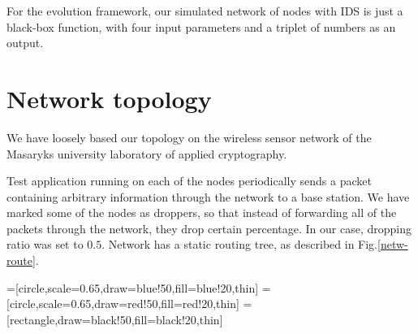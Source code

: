 \documentclass[12pt,oneside]{fithesis2}
\begin{document}
For the evolution framework, our simulated network of nodes with IDS is just a black-box function, with four input parameters and a triplet of numbers as an output. 


\section{Network topology}

We have loosely based our topology on the wireless sensor network of the Masaryks university laboratory of applied cryptography. 


Test application running on each of the nodes periodically sends a packet containing arbitrary information through the network to a base station. 
We have marked some of the nodes as droppers, so that instead of forwarding all of the packets through the network, they drop certain percentage. In our case, dropping ratio was set to $0.5$. Network has a static routing tree, as described in Fig.\ref{netw-route}.

=[circle,scale=0.65,draw=blue!50,fill=blue!20,thin]
=[circle,scale=0.65,draw=red!50,fill=red!20,thin]
=[rectangle,draw=black!50,fill=black!20,thin]
\end{document}
